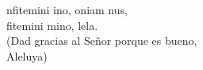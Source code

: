 \begin{cancion}[Confitemini][Taizé]%
	nfitemini ino, oniam nus,\\
	fitemini mino, lela.\\
(Dad gracias al Señor porque es bueno,\\
 Aleluya)\\
\end{cancion}%
